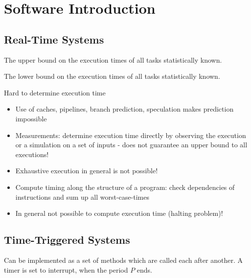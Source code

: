 


\section{Software Introduction}


\subsection{Real-Time Systems}

\begin{definition}
The upper bound on the execution times of all tasks statistically known.
\end{definition}

\begin{definition}
The lower bound on the execution times of all tasks statistically known.
\end{definition}


Hard to determine execution time

\begin{itemize}[noitemsep]
\item Use of caches, pipelines, branch prediction, speculation makes prediction impossible
\item Measurements: determine execution time directly by observing the execution or a simulation on a set of inputs - does not guarantee an upper bound to all executions!
\item Exhaustive execution in general is not possible!
\item Compute timing along the structure of a program: check dependencies of instructions and sum up all worst-case-times
\item In general not possible to compute execution time (halting problem)!
\end{itemize}


\subsection{Time-Triggered Systems}

Can be implemented as a set of methods which are called each after another. A timer is set to interrupt, when the period $P$ ends.

